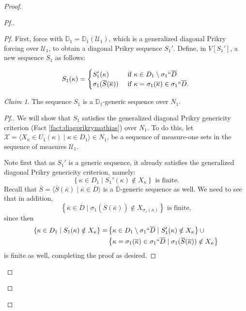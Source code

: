 \documentclass{amsart}
\theoremstyle{definition}
\theoremstyle{remark}
\newtheorem{claimno}{Claim}
\newcommand{\D}{\mathbb{D}}
\renewcommand{\S}{{\overline{S}}}
\newcommand{\U}{\mathcal{U}}
\newcommand{\st}{\; | \;}
\newcommand{\set}[2]{\left\{#1\st #2 \right\}}
\newcommand{\seq}[2]{\langle #1 \st #2 \rangle}
\begin{document}
\begin{proof}
\begin{proof}[Pf.]
\begin{proof}[Pf]
First, force with $\D_1 = \D_1(\mathcal U_1)$, which is a generalized diagonal Prikry forcing over $\mathcal U_1$, to obtain a diagonal Prikry sequence $S_1'$. 
Define, in $V[S_1']$, a new sequence $S_1$ as follows:

$$S_1(\kappa) = \begin{cases} S_1'(\kappa) &\text{ if } \kappa \in D_1 \setminus \sigma_1``\overline D \\
					\sigma_1(\overline S(\overline \kappa)) &\text{ if } \kappa = \sigma_1(\overline \kappa) \in \sigma_1``\overline D. \end{cases}$$

\begin{claimno} \label{Claim:S_1isPrikryoverN_1} The sequence $S_1$ is a $\D_1$-generic sequence over $N_1$. \end{claimno}
\begin{proof}[Pf.]
We will show that $S_1$ satisfies the generalized diagonal Prikry genericity criterion (Fact \ref{fact:diagprikrymathias}) over $N_1$. To do this, let $\mathcal X = \seq{ X_\kappa \in U_1(\kappa) }{ \kappa \in D_1 } \in N_1$, be a sequence of measure-one sets in the sequence of measures $\U_1$.

Note first that as $S_1'$ is a generic sequence, it already satisfies the generalized diagonal Prikry genericity criterion, namely:
$$\set{ \kappa \in D_1}{ S_1'(\kappa) \notin X_\kappa } \text{ is finite.}$$
Recall that $\S = \seq{ \S(\overline \kappa) }{ \overline \kappa \in \overline D }$ is a $\overline{\D}$-generic sequence as well.
We need to see that in addition,
$$\set{ \overline \kappa \in \overline D}{\sigma_1(\S(\overline \kappa)) \notin X_{\sigma_1(\overline \kappa)} }  \text{ is finite,}$$
since then 
\begin{align*}
\set{ \kappa \in D_1}{ S_1(\kappa) \notin X_\kappa } = & \set{ \kappa \in D_1 \setminus \sigma_1``\overline D}{ S_1'(\kappa) \notin X_\kappa } \cup\\
& \set{ \kappa = \sigma_1(\overline \kappa) \in \sigma_1``\overline D}{\sigma_1(\S(\overline \kappa)) \notin X_\kappa }
\end{align*}
is finite as well, completing the proof as desired.


\end{proof}
\end{proof}
\end{proof}
\end{proof}
\end{document}
